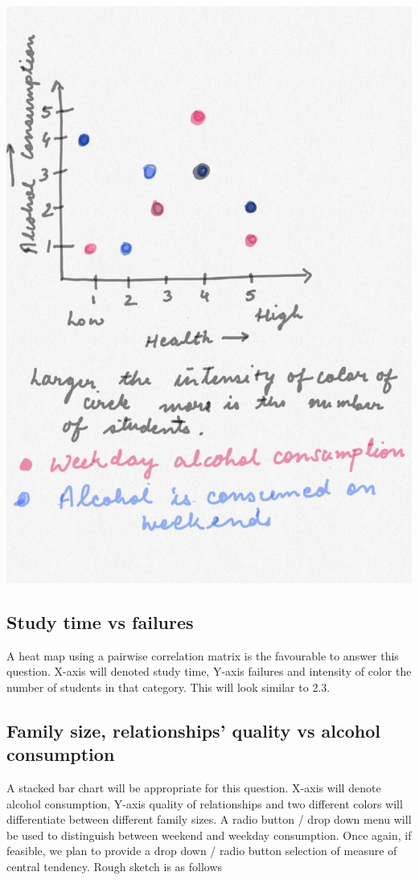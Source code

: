 \documentclass[titlepage, 12pt]{article}
\begin{document}
\begin{center}
\includegraphics[scale=0.3]{6}
\end{center}

\subsection{Study time vs failures}
A heat map using a pairwise correlation matrix is the favourable to answer this
question. X-axis will denoted study time, Y-axis failures and intensity of color
the number of students in that category. This will look similar to 2.3.

\subsection{Family size, relationships' quality vs alcohol consumption}
A stacked bar chart will be appropriate for this question. X-axis will denote
alcohol consumption, Y-axis quality of relationships and two different colors
will differentiate between different family sizes. A radio button / drop down
menu will be used to distinguish between weekend and weekday consumption. Once
again, if feasible, we plan to provide a drop down / radio button selection of
measure of central tendency. Rough sketch is as follows
\end{document}
